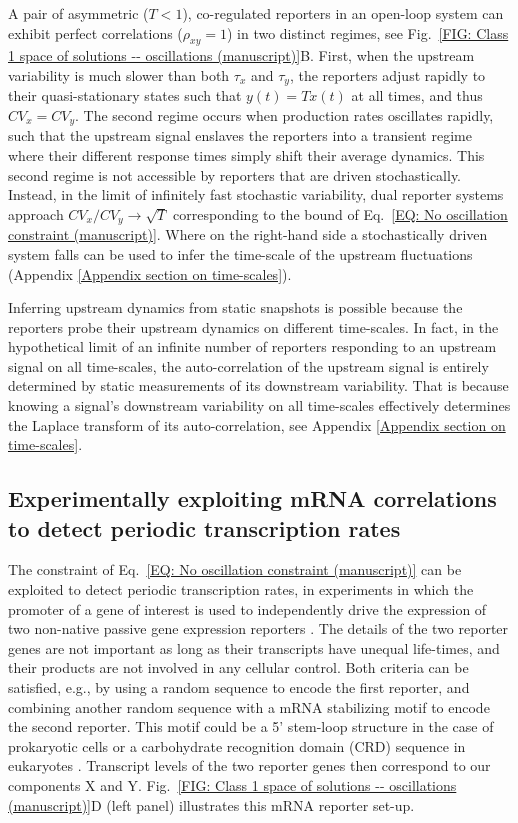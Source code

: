 \documentclass[%
 reprint,prx,
superscriptaddress,
%
%
%
%
%
%
%
%
%
 amsmath,amssymb,
 aps,
%
%
%
%
%
%
]{revtex4-2}
\begin{document}
A pair of asymmetric ($T < 1$), co-regulated reporters in an open-loop system can exhibit perfect correlations ($\rho_{xy} = 1$) in two distinct regimes, see Fig.~\ref{FIG: Class 1 space of solutions -- oscillations (manuscript)}B. First, when the upstream variability is much slower than both $\tau_{x}$ and $\tau_{y}$, the reporters adjust rapidly to their quasi-stationary states such that $y(t) = T x(t)$ at all times, and thus $CV_x = CV_y$.
The second regime occurs when production rates oscillates rapidly, such that the upstream signal enslaves the reporters into a transient regime where their different response times %
simply shift their average dynamics. 
This second regime is not accessible by reporters that are driven stochastically. Instead, in the limit of infinitely fast stochastic variability, dual reporter systems approach $CV_{x}/CV_{y} \to \sqrt{T}$ corresponding to the bound of Eq.~\eqref{EQ: No oscillation constraint (manuscript)}. %
Where on the right-hand side a stochastically driven system falls can be used to infer the time-scale of the upstream fluctuations (Appendix \ref{Appendix section on time-scales}).


Inferring upstream dynamics from static snapshots is possible because the reporters probe their upstream dynamics on different time-scales. In fact, in the hypothetical limit of an infinite number of reporters responding to an upstream signal on all time-scales, the auto-correlation of the upstream signal is entirely determined by static measurements of its downstream variability. That is because knowing a signal's downstream variability on all time-scales effectively determines the Laplace transform of its auto-correlation, see Appendix \ref{Appendix section on time-scales}.

\subsection{Experimentally exploiting mRNA correlations to detect periodic transcription rates}
%
\vspace{-.75em}
The constraint of Eq.~\eqref{EQ: No oscillation constraint (manuscript)} can be exploited to detect {periodic transcription rates}, in experiments in which the {promoter} of a gene of interest is used to independently drive the expression of two non-native passive gene expression reporters {\cite{baudrimont2019contribution, raj2006stochastic}}. The details of the two reporter genes are not important as long as their transcripts have unequal life-times, and their products are not involved in any cellular control. Both criteria can be satisfied, e.g., by using a random sequence to encode the first reporter, and combining another random sequence with a mRNA stabilizing motif to encode the second reporter. This motif could be a 5' stem-loop structure in the case of prokaryotic cells or a carbohydrate recognition domain (CRD) sequence in eukaryotes \cite{emory19925,cheneval2010review}. Transcript levels of the two reporter genes then correspond to our components X and Y. Fig.~\ref{FIG: Class 1 space of solutions -- oscillations (manuscript)}D (left panel) illustrates this mRNA reporter set-up. 
\end{document}
